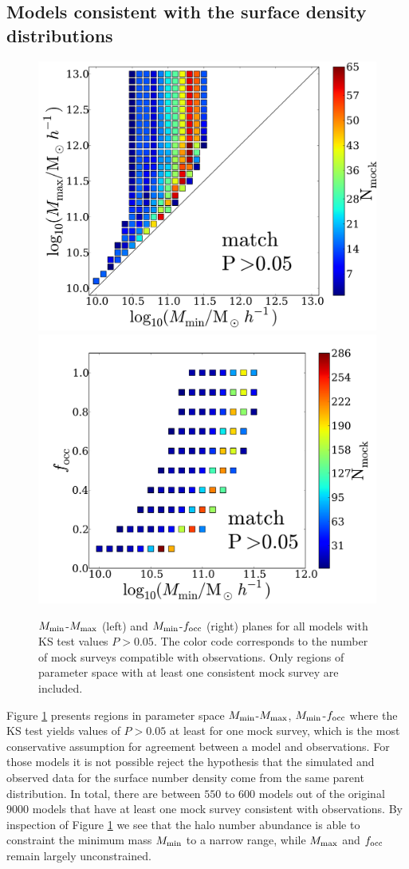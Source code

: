 \documentclass[usenatbib]{mn2e}
\begin{document}
\subsection{Models consistent with the surface density distributions}

\begin{figure}
\begin{center}
\includegraphics[width=0.46\linewidth,angle=0]{Fig2_match_P5.pdf}
\vspace{5mm}
\includegraphics[width=0.49\linewidth,angle=0]{Fig3_match_P5.pdf}
\end{center} 
\caption{$M_{\rm min}$-$M_{\rm max}$ (left) and $M_{\rm    min}$-$f_{\rm
    occ}$ (right) planes for all models with  KS test values
  $P>0.05$. The color code corresponds to the number of mock surveys
  compatible with observations. Only regions of parameter  space with
  at least one consistent mock survey are  included. \label{fig:landscape}}     
\end{figure}


Figure \ref{fig:landscape} presents regions in parameter space $M_{\rm
min}$-$M_{\rm max}$, $M_{\rm min}$-$f_{\rm occ}$ where the KS test yields
values of $P>0.05$ at least for one mock survey, which is the most
conservative assumption for agreement between a model and observations. For those models it
is not possible reject the hypothesis that the simulated and observed
data for the surface number density come from the same parent
distribution. In total, there are between $550$ to $600$ models out of
the original $9000$ models that have at least one mock survey
consistent with observations. By inspection of Figure
\ref{fig:landscape} we see that the halo number abundance is able to
constraint the minimum mass $M_{\rm min}$ to a narrow range, while
$M_{\rm max}$ and $f_{\rm occ}$ remain largely unconstrained.
\end{document}

